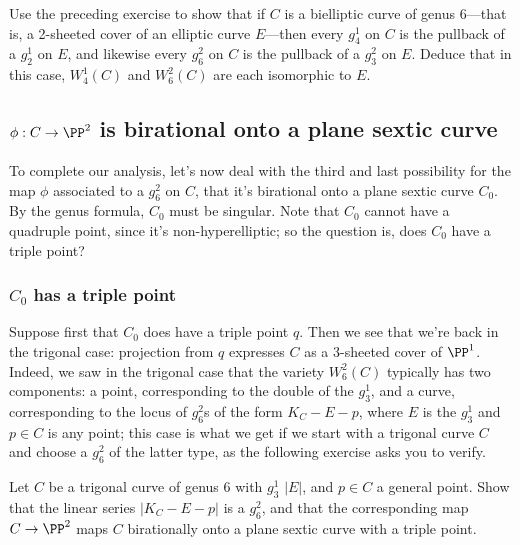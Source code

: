 \begin{exercise}
Use the preceding exercise to show that if $C$ is a bielliptic curve of genus 6---that is, a 2-sheeted cover of an elliptic curve $E$---then every $g^1_4$ on $C$ is the pullback of a $g^1_2$ on $E$, and likewise  every $g^2_6$ on $C$ is the pullback of a $g^2_3$ on $E$. Deduce that in this case, $W^1_4(C)$ and $W^2_6(C)$ are each isomorphic to $E$.
\end{exercise}

\subsection{$\phi : C \to \PP^2$ is birational onto a plane sextic curve}

To complete our analysis, let's now deal with the third and last possibility for the map $\phi$ associated to a $g^2_6$ on $C$, that it's birational onto a plane sextic curve $C_0$. By the genus formula, $C_0$ must be singular. Note that $C_0$ cannot have a quadruple point, since it's non-hyperelliptic; so the question is, does $C_0$ have a triple point?

\subsubsection{$C_0$ has a triple point} Suppose first that $C_0$ does have a triple point $q$. Then we see that we're back in the trigonal case: projection from $q$ expresses $C$ as a 3-sheeted cover of $\PP^1$. Indeed, we saw in the trigonal case that the variety $W^2_6(C)$ typically has two components: a point, corresponding to the double of the $g^1_3$, and a curve, corresponding to the locus of $g^2_6$s of the form $K_C - E - p$, where $E$ is the $g^1_3$ and $p \in C$ is any point; this case is what we get if we start with a trigonal curve $C$ and choose a $g^2_6$ of the latter type, as the following exercise asks you to verify.


\begin{exercise}
Let $C$ be a trigonal curve of genus 6 with $g^1_3$ $|E|$, and $p \in C$ a general point. Show that the linear series $|K_C - E-p|$ is a $g^2_6$, and that the corresponding map $C \to \PP^2$ maps $C$ birationally onto a plane sextic curve with a triple point.
\end{exercise}

